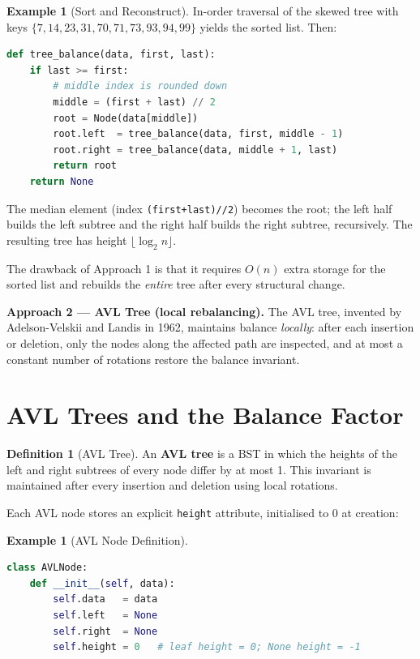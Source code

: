 \documentclass[11pt, a4paper, notitlepage]{report}
\theoremstyle{definition}
\newtheorem{definition}[theorem]{Definition}
\theoremstyle{remark}
\theoremstyle{definition}
\newtheorem{example}[theorem]{Example}
\begin{document}
\begin{example}[Sort and Reconstruct]
\label{ex:sort-reconstruct}
In-order traversal of the skewed tree with keys $\{7,14,23,31,70,71,73,93,94,99\}$ yields
the sorted list.  Then:
\begin{lstlisting}[language=Python]
def tree_balance(data, first, last):
    if last >= first:
        # middle index is rounded down
        middle = (first + last) // 2
        root = Node(data[middle])
        root.left  = tree_balance(data, first, middle - 1)
        root.right = tree_balance(data, middle + 1, last)
        return root
    return None
\end{lstlisting}
The median element (index \texttt{(first+last)//2}) becomes the root; the left half builds
the left subtree and the right half builds the right subtree, recursively.
The resulting tree has height $\lfloor \log_2 n \rfloor$.
\end{example}

The drawback of Approach 1 is that it requires $O(n)$ extra storage for the sorted list and
rebuilds the \emph{entire} tree after every structural change.

\textbf{Approach 2 --- AVL Tree (local rebalancing).}  The AVL tree, invented by
Adelson-Velskii and Landis in 1962, maintains balance \emph{locally}: after each insertion
or deletion, only the nodes along the affected path are inspected, and at most a constant
number of rotations restore the balance invariant.

\section{AVL Trees and the Balance Factor}
\label{sec:avl-balance-factor}

\begin{definition}[AVL Tree]
\label{def:avl-tree}
An \textbf{AVL tree} is a BST in which the heights of the left and right subtrees of every
node differ by at most 1.  This invariant is maintained after every insertion and deletion
using local rotations.
\end{definition}

Each AVL node stores an explicit \texttt{height} attribute, initialised to 0 at creation:

\begin{example}[AVL Node Definition]
\label{ex:avl-node}
\leavevmode
\begin{lstlisting}[language=Python]
class AVLNode:
    def __init__(self, data):
        self.data   = data
        self.left   = None
        self.right  = None
        self.height = 0   # leaf height = 0; None height = -1
\end{lstlisting}
\end{example}
\end{document}
